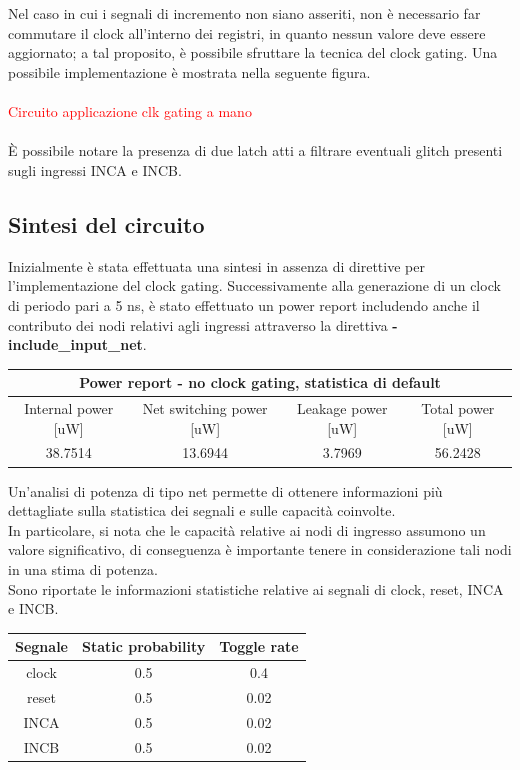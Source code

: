 \documentclass[11pt,  english, makeidx, a4paper, titlepage, oneside]{book}
\begin{document}
\\\\
Nel caso in cui i segnali di incremento non siano asseriti, non è necessario far commutare il clock all'interno dei registri, in quanto nessun valore deve essere aggiornato; a tal proposito, è possibile sfruttare la tecnica del clock gating. Una possibile implementazione è mostrata nella seguente figura.
\\\\
\textcolor{red}{Circuito applicazione clk gating a mano}
\\\\
È possibile notare la presenza di due latch atti a filtrare eventuali glitch presenti sugli ingressi INCA e INCB.
\subsection{Sintesi del circuito}
Inizialmente è stata effettuata una sintesi in assenza di direttive per l'implementazione del clock gating.
Successivamente alla generazione di un clock di periodo pari a 5 ns, è stato effettuato un power report includendo anche il contributo dei nodi relativi agli ingressi attraverso la direttiva \textbf{-include\_input\_net}.
\\
\begin{center}
	\begin{tabular}{|c|c|c|c|}
	\hline
	\multicolumn{4}{c}{Power report - no clock gating, statistica di default} \\
	\hline
	Internal power [uW] & Net switching power [uW] & Leakage power [uW] & Total power [uW] \\
	\hline
	 38.7514 & 13.6944  &  3.7969  &  56.2428 \\
	\hline
	\end{tabular}	
\end{center}
\vspace{0.3cm}
Un'analisi di potenza di tipo net permette di ottenere informazioni più dettagliate sulla statistica dei segnali e sulle capacità coinvolte. 
\\
In particolare, si nota che le capacità relative ai nodi di ingresso assumono un valore significativo, di conseguenza è importante tenere in considerazione tali nodi in una stima di potenza.
\\
Sono riportate le informazioni statistiche relative ai segnali di clock, reset, INCA e INCB.
\\
\begin{center}
	\begin{tabular}{|c|c|c|}
	\hline
Segnale & Static probability & Toggle rate \\
	\hline
	 clock & 0.5  &  0.4 \\
	\hline
	 reset & 0.5  &  0.02 \\
	\hline
	 INCA & 0.5  &  0.02 \\
	\hline
	 INCB & 0.5  &  0.02 \\
	\hline
	\end{tabular}	
\end{center}
\end{document}
